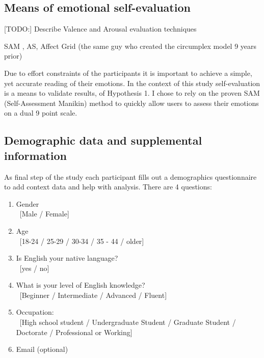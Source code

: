 

	\subsection{Means of emotional self-evaluation} \label{sec:selfeval}
	
	
	
	[TODO:] Describe Valence and Arousal evaluation techniques
	
	SAM , AS, Affect Grid \cite{Russell1989} (the same guy who created the circumplex model 9 years prior)
	
	Due to effort constraints of the participants it is important to achieve a simple, yet accurate reading of their emotions. In the context of this study self-evaluation is a means to validate results, of Hypothesis 1. I chose to rely on the proven SAM (Self-Assessment Manikin) method \cite{Bradley1994} to quickly allow users to assess their emotions on a dual 9 point scale.
	
	\subsection{Demographic data and supplemental information} \label{sec:demographics}
	
	As final step of the study each participant fills out a demographics questionnaire to add context data and help with analysis. There are 4 questions:
	
	\begin{enumerate}
		\item Gender \\ \ [Male / Female]
		\item Age \\ \ [18-24 / 25-29 / 30-34 / 35 - 44 / older]
		\item Is English your native language? \\ \ [yes / no]
		\item What is your level of English knowledge? \\ \
			[Beginner  / Intermediate / Advanced / Fluent]
		\item Occupation: \\ \ [High school student / Undergraduate Student / Graduate Student / Doctorate / Professional or Working]
		\item Email (optional)
	\end{enumerate}


